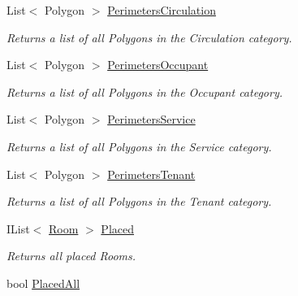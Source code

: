 \begin{DoxyCompactItemize}
List$<$ Polygon $>$ \mbox{\hyperlink{class_room_kit_1_1_scope_a50afa848202d6bfdad55a605c22cf3fe}{Perimeters\+Circulation}}
\begin{DoxyCompactList}\small\item\em Returns a list of all Polygons in the Circulation category. \end{DoxyCompactList}\item 
List$<$ Polygon $>$ \mbox{\hyperlink{class_room_kit_1_1_scope_ac7fcbc419e0f7b4242e38c69b96ae28f}{Perimeters\+Occupant}}
\begin{DoxyCompactList}\small\item\em Returns a list of all Polygons in the Occupant category. \end{DoxyCompactList}\item 
List$<$ Polygon $>$ \mbox{\hyperlink{class_room_kit_1_1_scope_a16f2c7376beddabff7a1e5f664faa12f}{Perimeters\+Service}}
\begin{DoxyCompactList}\small\item\em Returns a list of all Polygons in the Service category. \end{DoxyCompactList}\item 
List$<$ Polygon $>$ \mbox{\hyperlink{class_room_kit_1_1_scope_a529c86de463bfe3ec9eb868778c161db}{Perimeters\+Tenant}}
\begin{DoxyCompactList}\small\item\em Returns a list of all Polygons in the Tenant category. \end{DoxyCompactList}\item 
I\+List$<$ \mbox{\hyperlink{class_room_kit_1_1_room}{Room}} $>$ \mbox{\hyperlink{class_room_kit_1_1_scope_a36faac20f6426794ed265d2e6f7671c1}{Placed}}
\begin{DoxyCompactList}\small\item\em Returns all placed Rooms. \end{DoxyCompactList}\item 
bool \mbox{\hyperlink{class_room_kit_1_1_scope_af42e82ed90f2d533b61f2dc9961a6be4}{Placed\+All}}

\end{DoxyCompactItemize}
